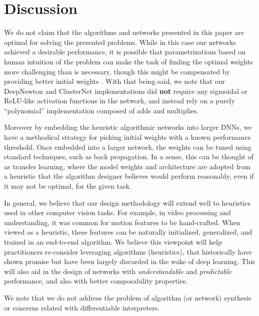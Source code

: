 \documentclass{article}
\begin{document}

\section{Discussion}
We do not claim that the algorithms and networks presented in this paper are optimal for solving the presented problems.  While in this case our networks achieved a desirable performance, it is possible that parametrizations based on human intuition of the problem can make the task of finding the optimal weights more challenging than is necessary, though this might be compensated by providing better initial weights \cite{mishkin2015all}. With that being said, we note that our DeepNewton and ClusterNet implementations did \textbf{not} require any sigmoidal or ReLU-like activation functions in the network, and instead rely on a purely ``polynomial'' implementation composed of adds and multiplies.

Moreover by embedding the heuristic algorithmic networks into larger DNNs, we have a methodical strategy for picking initial weights with a known performance threshold. Once embedded into a larger network, the weights can be tuned using standard techniques, such as back propagation. In a sense, this can be thought of as transfer learning, where the model weights and architecture are adopted from a heuristic that the algorithm designer believes would perform reasonably, even if it may not be optimal, for the given task.

In general, we believe that our design methodology will extend well to heuristics used in other computer vision tasks. For example, in video processing and understanding, it was common for motion features to be hand-crafted. When viewed as a heuristic, these features can be naturally initialized, generalized, and trained in an end-to-end algorithm. We believe this viewpoint will help practitioners re-consider leveraging algorithms (heuristics), that historically have shown promise but have been largely discarded in the wake of deep learning. This will also aid in the design of networks with \textsl{understandable} and \textsl{predictable} performance, and also with better composability properties.

We note that we do not address the problem of algorithm (or network) synthesis or concerns related with differentiable interpreters.
\end{document}
